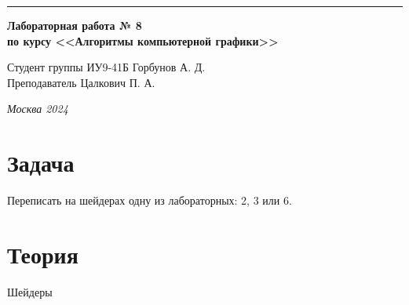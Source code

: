 \documentclass[a4paper, 14pt]{extarticle}
\begin{document}
\begin{titlepage}
\vspace*{-16pt}
\hspace{30pt}\rule{0.866\textwidth}{0.4pt}
  
\vspace{11em}

\begin{center}
\Large {\bf Лабораторная работа № 8} \\ 
\large {\bf по курсу <<Алгоритмы компьютерной графики>>}\\
\end{center}\normalsize

\vspace{8em}


\begin{flushright}
  {Студент группы ИУ9-41Б Горбунов А. Д.\hspace*{15pt} \\
  \vspace{2ex}
  Преподаватель Цалкович П. А.\hspace*{15pt}}
\end{flushright}

\bigskip

\vfill
 

\begin{center}
\textsl{Москва 2024}
\end{center}
\end{titlepage}

\renewcommand{\ttdefault}{pcr}

\setlength{\tabcolsep}{3pt}
\newpage
\setcounter{page}{2}

\section{Задача}\label{Sect::task}
\par
Переписать на шейдерах одну из лабораторных: 2, 3 или 6.

\section{Теория}\label{Sect::task}
\par

\begin{center}
\Large {Шейдеры} \\ 
\end{center}\normalsize
\end{document}
